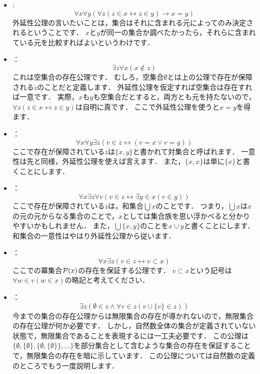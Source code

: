\documentclass[./main]{subfiles}
\begin{document}
\begin{itemize}
\item
{}:
\[
\forall x\forall y(\forall z(z\in x\leftrightarrow z\in y)\to x=y)
\]
外延性公理の言いたいことは，集合はそれに含まれる元によってのみ決定されるということです．
$x$と$y$が同一の集合か調べたかったら，それらに含まれている元を比較すればよいというわけです．

\item
{}：
\[
\exists z\forall x(x\notin z)
\]
これは空集合の存在公理です．
むしろ，空集合$\emptyset$とは上の公理で存在が保障される$z$のことだと定義します．
外延性公理を仮定すれば空集合は存在すれば一意です．
実際，$x$も$y$も空集合だとすると，両方とも元を持たないので，$\forall z(z\in x\leftrightarrow z\in y)$は自明に真です．
ここで外延性公理を使うと$x=y$を得ます．

\item
{}：
\[
\forall x\forall y\exists z(v\in z\leftrightarrow(v=x\vee v=y))
\]
ここで存在が保障されている$z$は$\{x, y\}$と書かれて対集合と呼ばれます．
一意性は先と同様，外延性公理を使えば言えます．
また，$\{x, x\}$は単に$\{x\}$と書くことにします．

\item
{}：
\[
\forall x\exists z\forall v(v\in z\leftrightarrow\exists y\in x(v\in y))
\]
ここで存在が保障されている$z$は，和集合$\bigcup x$のことです．
つまり，$\bigcup x$は$x$の元の元からなる集合のことで，$x$としては集合族を思い浮かべると分かりやすいかもしれません．
また，$\bigcup\{x,y\}$のことを$x\cup y$と書くことにします．
和集合の一意性はやはり外延性公理から従います．

\item
{}：
\[
\forall x\exists z(v\in z\leftrightarrow v\subset x)
\]
ここでの冪集合$\mathcal{P}(x)$の存在を保証する公理です．
$v\subset x$という記号は$\forall w\in v(w\in x)$の略記と考えてください．

\item
{}：
\[
\exists z(\emptyset\in z\wedge\forall v\in z(v\cup\{v\}\in z))
\]
今までの集合の存在公理からは無限集合の存在が導かれないので，無限集合の存在公理が何か必要です．
しかし，自然数全体の集合が定義されていない状態で，無限集合であることを表現するには一工夫必要です．
この公理は$\{\emptyset,\{\emptyset\},\{\emptyset,\{\emptyset\}\},\ldots\}$を部分集合として含むような集合の存在を保証することで，無限集合の存在を暗に示しています．
この公理については自然数の定義のところでもう一度説明します．


\end{itemize}
\end{document}
